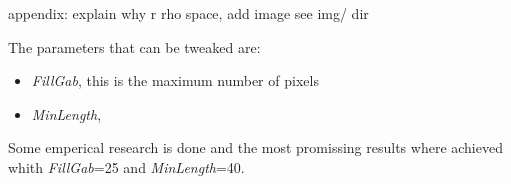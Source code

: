 	appendix:
	explain why r rho space, add image see img/ dir


	The parameters that can be tweaked are:
	\begin{itemize}
	\item \emph{FillGab}, this is the maximum number of pixels %
	\item \emph{MinLength},
	\end{itemize}
	Some emperical research is done and the most promissing results where achieved whith \emph{FillGab}=25 and \emph{MinLength}=40.
